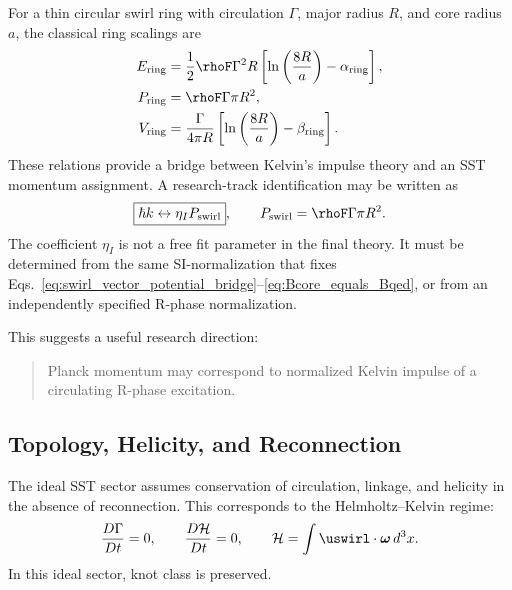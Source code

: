     For a thin circular swirl ring with circulation \(\Gamma\), major radius
    \(R\), and core radius \(a\), the classical ring scalings are
    \begin{align}
        E_{\rm ring}
        &=
        \frac{1}{2}\rhoF\Gamma^2 R
        \left[
            \ln\left(\frac{8R}{a}\right)-\alpha_{\rm ring}
        \right],
        \label{eq:ring_energy}
        \\
        P_{\rm ring}
        &=
        \rhoF\Gamma\pi R^2,
        \label{eq:ring_impulse}
        \\
        V_{\rm ring}
        &=
        \frac{\Gamma}{4\pi R}
        \left[
            \ln\left(\frac{8R}{a}\right)-\beta_{\rm ring}
        \right].
        \label{eq:ring_velocity}
    \end{align}
    These relations provide a bridge between Kelvin's impulse theory and an
    SST momentum assignment.  A research-track identification may be written
    as
    \begin{equation}
        \boxed{
            \hbar k
            \leftrightarrow
            \eta_I P_{\rm swirl}
        },
        \qquad
        P_{\rm swirl}
        =
        \rhoF\Gamma\pi R^2.
        \label{eq:hbar_k_kelvin_impulse_bridge}
    \end{equation}
    The coefficient \(\eta_I\) is not a free fit parameter in the final
    theory.  It must be determined from the same SI-normalization that fixes
    Eqs.~\eqref{eq:swirl_vector_potential_bridge}--\eqref{eq:Bcore_equals_Bqed},
    or from an independently specified R-phase normalization.
    
    This suggests a useful research direction:
    
    \begin{quote}
        Planck momentum may correspond to normalized Kelvin impulse of a circulating
        R-phase excitation.
    \end{quote}

\subsection{Topology, Helicity, and Reconnection}
    
    The ideal SST sector assumes conservation of circulation, linkage, and
    helicity in the absence of reconnection.  This corresponds to the
    Helmholtz--Kelvin regime:
    \begin{equation}
        \frac{D\Gamma}{Dt}=0,
        \qquad
        \frac{D\mathcal{H}}{Dt}=0,
        \qquad
        \mathcal{H}
        =
        \int
        \uswirl\cdot\boldsymbol{\omega}\,d^3x.
        \label{eq:helicity_conservation}
    \end{equation}
    In this ideal sector, knot class is preserved.
    
